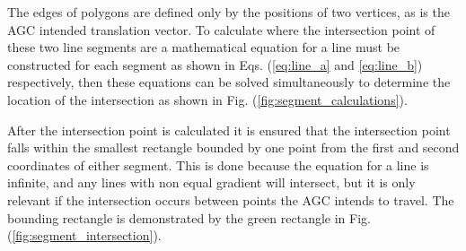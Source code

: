 \documentclass[11pt,landscape]{article}
\begin{document}
\begin{multicols}{3}
The edges of polygons are defined only by the positions of two vertices, as is
the AGC intended translation vector. To calculate where the intersection point
of these two line segments are a mathematical equation for a line must be
constructed for each segment as shown in Eqs. (\ref{eq:line_a} and
\ref{eq:line_b}) respectively, then these equations can be solved simultaneously
to determine the location of the intersection as shown in Fig.
(\ref{fig:segment_calculations}).

After the intersection point is calculated it is ensured that the intersection point
falls within the smallest rectangle bounded by one point from the first and
second coordinates of either segment. This is done because the equation for a line
is infinite, and any lines with non equal gradient will intersect, but it is
only relevant if the intersection occurs between points the AGC intends to
travel. The bounding rectangle is demonstrated by the green rectangle in Fig.
(\ref{fig:segment_intersection}).


\end{multicols}
\end{document}
